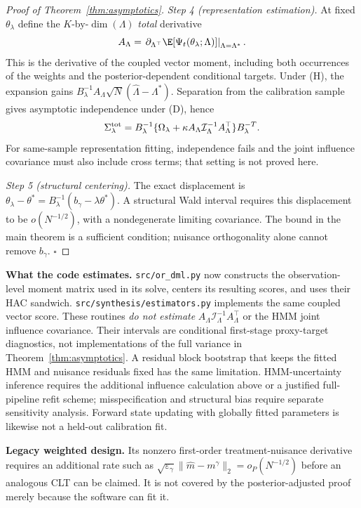 \begin{proof}[Proof of Theorem~\ref{thm:asymptotics}]
\emph{Step 4 (representation estimation).} At fixed $\theta_\lambda$ define the $K$-by-$\dim(\Lambda)$ \emph{total} derivative
\[
A_\Lambda=\left.\partial_{\Lambda^\top}
\E[\Psi_t(\theta_\lambda;\Lambda)]\right|_{\Lambda=\Lambda^*}.
\]
This is the derivative of the coupled vector moment, including both occurrences of the weights and the posterior-dependent conditional targets. Under (H), the expansion gains $B_\lambda^{-1}A_\Lambda\sqrt N(\hat\Lambda-\Lambda^*)$. Separation from the calibration sample gives asymptotic independence under (D), hence
\[
\Sigma_\lambda^{\rm tot}
=B_\lambda^{-1}\{\Omega_\lambda+
\kappa A_\Lambda\mathcal I_\Lambda^{-1}A_\Lambda^\top\}B_\lambda^{-T}.
\]
For same-sample representation fitting, independence fails and the joint influence covariance must also include cross terms; that setting is not proved here.

\emph{Step 5 (structural centering).} The exact displacement is $\theta_\lambda-\theta^*=B_\lambda^{-1}(b_\gamma-\lambda\theta^*)$. A structural Wald interval requires this displacement to be $o(N^{-1/2})$, with a nondegenerate limiting covariance. The bound in the main theorem is a sufficient condition; nuisance orthogonality alone cannot remove $b_\gamma$. $\square$
\end{proof}

\textbf{What the code estimates.} \texttt{src/or\_dml.py} now constructs the observation-level moment matrix used in its solve, centers its resulting scores, and uses their HAC sandwich. \texttt{src/synthesis/estimators.py} implements the same coupled vector score. These routines \emph{do not estimate} $A_\Lambda\mathcal I_\Lambda^{-1}A_\Lambda^\top$ or the HMM joint influence covariance. Their intervals are conditional first-stage proxy-target diagnostics, not implementations of the full variance in Theorem~\ref{thm:asymptotics}. A residual block bootstrap that keeps the fitted HMM and nuisance residuals fixed has the same limitation. HMM-uncertainty inference requires the additional influence calculation above or a justified full-pipeline refit scheme; misspecification and structural bias require separate sensitivity analysis. Forward state updating with globally fitted parameters is likewise not a held-out calibration fit.

\textbf{Legacy weighted design.} Its nonzero first-order treatment-nuisance derivative requires an additional rate such as $\sqrt{\varepsilon_\gamma}\|\hat m-m^\gamma\|_2=o_P(N^{-1/2})$ before an analogous CLT can be claimed. It is not covered by the posterior-adjusted proof merely because the software can fit it.

